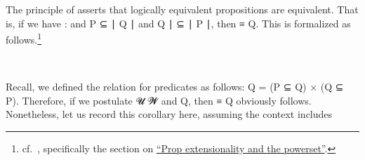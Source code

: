 
The principle of  asserts that logically equivalent propositions are equivalent. That is, if we have  \as :  and  \ab P  \af ⊆ \af ∣ \ab Q \af ∣ and
 \ab Q \af ∣ \af ⊆ \af ∣ \ab P \af ∣, then  \aod ≡ \ab Q. This is formalized
as follows.\footnote{cf.~\cite{MHE}, specifically the section on \href{https://www.cs.bham.ac.uk/~mhe/HoTT-UF-in-Agda-Lecture-Notes/HoTT-UF-Agda.html\#250227}{``Prop extensionality and the powerset''}.}
\ccpad
\begin{code}%
\>[0]\AgdaSpace{}%
\AgdaSymbol{:}\AgdaSpace{}%
\AgdaSymbol{(}\AgdaSpace{}%
\AgdaSpace{}%
\AgdaSymbol{:}\AgdaSpace{}%
\AgdaSymbol{)}\AgdaSpace{}%
\AgdaSpace{}%
\AgdaSymbol{(}\AgdaSpace{}%
\AgdaSpace{}%
\AgdaSymbol{)}\AgdaSpace{}%
\AgdaSpace{}%
\<%
\\
\>[0]\AgdaSpace{}%
\AgdaSpace{}%
\AgdaSpace{}%
\AgdaSymbol{=}\AgdaSpace{}%
\AgdaSpace{}%
\AgdaSymbol{\{}\AgdaSpace{}%
\AgdaSymbol{:}\AgdaSpace{}%
\AgdaSpace{}%
\AgdaSymbol{\}\{}\AgdaSpace{}%
\AgdaSpace{}%
\AgdaSymbol{:}\AgdaSpace{}%
\AgdaSpace{}%
\AgdaSpace{}%
\AgdaSpace{}%
\AgdaSymbol{\}}\AgdaSpace{}%
\AgdaSpace{}%
\AgdaSpace{}%
\AgdaSpace{}%
\AgdaSpace{}%
\AgdaSpace{}%
\AgdaSpace{}%
\AgdaSpace{}%
\AgdaSpace{}%
\AgdaSpace{}%
\AgdaSpace{}%
\AgdaSpace{}%
\AgdaSpace{}%
\AgdaSpace{}%
\AgdaSpace{}%
\AgdaSpace{}%
\AgdaSpace{}%
\AgdaSpace{}%
\AgdaSpace{}%
\AgdaSpace{}%
\<%
\end{code}
\ccpad
Recall, we defined the relation  for predicates as follows:   \ab Q \as = (\ab P \af ⊆ \ab Q) \af × (\ab Q \af ⊆ \ab P). Therefore, if we postulate  \ab 𝓤 \ab 𝓦 and   \ab Q, then  \aod ≡ \ab Q obviously follows. Nonetheless, let us record this corollary here, assuming the context includes \AgdaSymbol{\{}\AgdaSpace{}%
